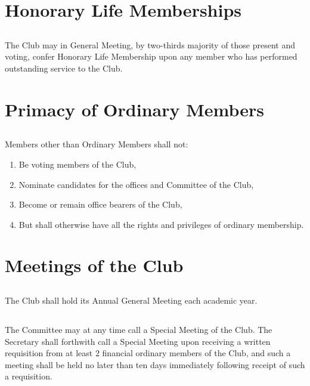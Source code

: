 \documentclass[10.5pt]{article}
\begin{document}
\section{Honorary Life Memberships}
\subsection{}
The Club may in General Meeting, by two-thirds majority of those present and voting, confer Honorary Life Membership upon any member who has performed outstanding service to the Club.
\newline


\section{Primacy of Ordinary Members}
\subsection{}
Members other than Ordinary Members shall not:
\begin{enumerate}[label=(\alph*)]
    \item Be voting members of the Club,
    \item Nominate candidates for the offices and Committee of the Club,
    \item Become or remain office bearers of the Club,
    \item But shall otherwise have all the rights and privileges of ordinary membership.
    \newline
\end{enumerate}


\section{Meetings of the Club}
\subsection{}
The Club shall hold its Annual General Meeting each academic year.

\subsection{}
The Committee may at any time call a Special Meeting of the Club. The Secretary shall forthwith call a Special Meeting upon receiving a written requisition from at least 2 financial ordinary members of the Club, and such a meeting shall be held no later than ten days immediately following receipt of such a requisition.
\end{document}
